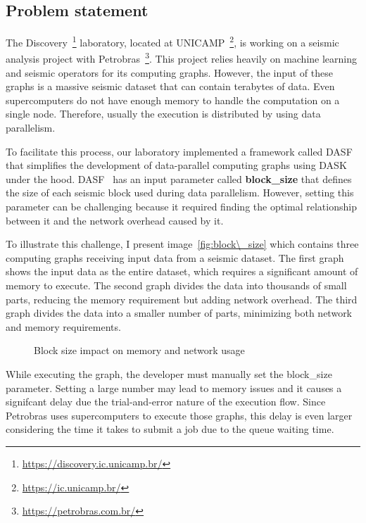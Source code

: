 \subsection{Problem statement}
\label{subsec:problem-statement}

The Discovery~\footnote{\url{https://discovery.ic.unicamp.br/}} laboratory, located at UNICAMP~\footnote{\url{https://ic.unicamp.br/}}, is working on a seismic analysis project with Petrobras~\footnote{\url{https://petrobras.com.br/}}.
This project relies heavily on machine learning and seismic operators for its computing graphs.
However, the input of these graphs is a massive seismic dataset that can contain terabytes of data.
Even supercomputers do not have enough memory to handle the computation on a single node.
Therefore, usually the execution is distributed by using data parallelism.

To facilitate this process, our laboratory implemented a framework called DASF~\cite{dasf} that simplifies the development of data-parallel computing graphs using DASK~\cite{dask} under the hood.
DASF~\cite{dasf} has an input parameter called \textbf{block\_size} that defines the size of each seismic block used during data parallelism.
However, setting this parameter can be challenging because it required finding the optimal relationship between it and the network overhead caused by it.

To illustrate this challenge, I present image~\ref{fig:block\_size} which contains three computing graphs receiving input data from a seismic dataset.
The first graph shows the input data as the entire dataset, which requires a significant amount of memory to execute.
The second graph divides the data into thousands of small parts, reducing the memory requirement but adding network overhead.
The third graph divides the data into a smaller number of parts, minimizing both network and memory requirements.

\begin{figure}[h]
\label{fig:block-size}
\caption{Block size impact on memory and network usage}
\end{figure}

While executing the graph, the developer must manually set the block\_size parameter.
Setting a large number may lead to memory issues and it causes a signifcant delay due the trial-and-error nature of the execution flow.
Since Petrobras uses supercomputers to execute those graphs, this delay is even larger considering the time it takes to submit a job due to the queue waiting time.

